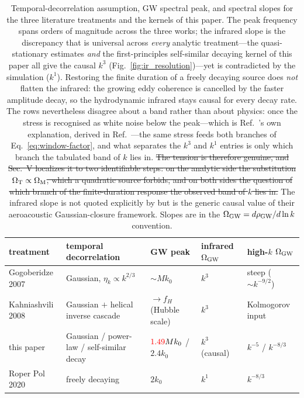 \documentclass[10pt,prd,aps,nobibnotes,superscriptaddress,preprintnumbers,notitlepage]{revtex4-1}
\newcommand{\add}[1]{{\color{red}#1}}
\newcommand{\del}[1]{{\color{red}\sout{#1}}}
\newcommand{\add}[1]{#1}
\newcommand{\del}[1]{}
\begin{document}
\begin{table}[ht]
  \centering
  \begin{tabular}{l l l l l}
    \hline\hline
    treatment & temporal decorrelation & GW peak & infrared $\Omega_{\rm GW}$ & high-$k$ $\Omega_{\rm GW}$ \\
    \hline
    Gogoberidze 2007 \cite{Gogoberidze:2007an} & Gaussian, $\eta_k\propto k^{2/3}$  & $\sim M k_0$  & $k^3$ & steep ($\sim k^{-9/2}$) \\
    Kahniashvili 2008 \cite{Kahniashvili:2008pe} & Gaussian $+$ helical inverse cascade & $\to f_H$ (Hubble scale) & $k^3$  & Kolmogorov input \\
    this paper  & Gaussian / power-law / self-similar decay & $\add{1.49}Mk_0$ / $2.4k_0$ & $k^3$ (causal)  & $k^{-5}$ / $k^{-8/3}$ \\
    Roper Pol 2020 \cite{RoperPol:2019wvy} & freely decaying & $2k_0$ & $k^1$ & $k^{-8/3}$ \\
    \hline\hline
  \end{tabular}
  \caption{Temporal-decorrelation assumption, GW spectral peak, and spectral slopes for the
  three literature treatments and the kernels of this paper. The peak frequency spans orders
  of magnitude across the three works; the infrared slope is the discrepancy that is
  universal across \emph{every} analytic treatment---the quasi-stationary estimates
  \emph{and} the first-principles self-similar decaying kernel of this paper all give the
  causal $k^3$ (Fig.~\ref{fig:ir_resolution})---yet is contradicted by the simulation
  ($k^1$). Restoring the finite duration of a freely decaying source does \emph{not} flatten
  the infrared: the growing eddy coherence is cancelled by the faster amplitude decay, so the
  hydrodynamic infrared stays causal for every decay rate. \add{The rows nevertheless
  disagree about a band rather than about physics: once the stress is recognised as
  white noise below the peak---which is Ref.~\cite{RoperPol:2019wvy}'s own explanation,
  derived in Ref.~\cite{Brandenburg:2019uzj}---the same stress feeds both branches of
  Eq.~\eqref{eq:window-factor}, and what separates the $k^{3}$ and $k^{1}$ entries is
  only which branch the tabulated band of $k$ lies in.}
  \del{The tension is therefore genuine, and Sec.~V localizes it to two identifiable
  steps: on the analytic side the substitution $\Omega_{\rm T}\propto\Omega_{\rm M}$,
  which a quadratic source forbids, and on both sides the question of which branch of the
  finite-duration response the observed band of $k$ lies in.}
  The infrared slope is not quoted explicitly by
  \cite{Kahniashvili:2008pe} but is the generic causal value of their aeroacoustic
  Gaussian-closure framework. Slopes are in the $\Omega_{\rm GW}=d\rho_{\rm GW}/d\ln k$
  convention.}
  \label{tab:three-works}
\end{table}
\end{document}
